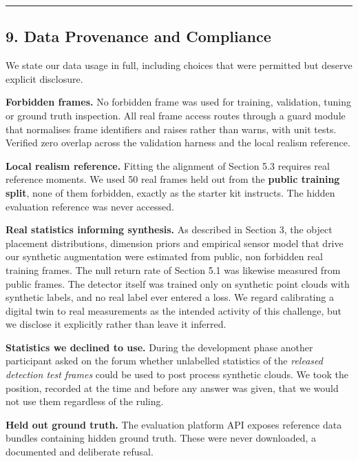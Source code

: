 \documentclass[
  10pt,
]{article}
\newcounter{none} %
\begin{document}
\begin{center}\rule{0.5\linewidth}{0.5pt}\end{center}

\subsection{9. Data Provenance and
Compliance}\label{data-provenance-and-compliance}

We state our data usage in full, including choices that were permitted
but deserve explicit disclosure.

\textbf{Forbidden frames.} No forbidden frame was used for training,
validation, tuning or ground truth inspection. All real frame access
routes through a guard module that normalises frame identifiers and
raises rather than warns, with unit tests. Verified zero overlap across
the validation harness and the local realism reference.

\textbf{Local realism reference.} Fitting the alignment of Section 5.3
requires real reference moments. We used 50 real frames held out from
the \textbf{public training split}, none of them forbidden, exactly as
the starter kit instructs. The hidden evaluation reference was never
accessed.

\textbf{Real statistics informing synthesis.} As described in Section 3,
the object placement distributions, dimension priors and empirical
sensor model that drive our synthetic augmentation were estimated from
public, non forbidden real training frames. The null return rate of
Section 5.1 was likewise measured from public frames. The detector
itself was trained only on synthetic point clouds with synthetic labels,
and no real label ever entered a loss. We regard calibrating a digital
twin to real measurements as the intended activity of this challenge,
but we disclose it explicitly rather than leave it inferred.

\textbf{Statistics we declined to use.} During the development phase
another participant asked on the forum whether unlabelled statistics of
the \emph{released detection test frames} could be used to post process
synthetic clouds. We took the position, recorded at the time and before
any answer was given, that we would not use them regardless of the
ruling.

\textbf{Held out ground truth.} The evaluation platform API exposes
reference data bundles containing hidden ground truth. These were never
downloaded, a documented and deliberate refusal.
\end{document}
